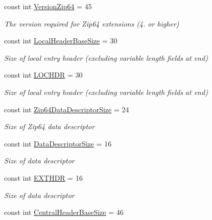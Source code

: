 \begin{DoxyCompactItemize}
const int \hyperlink{class_i_c_sharp_code_1_1_sharp_zip_lib_1_1_zip_1_1_zip_constants_a1ebeab1ac80ed9fc582bfc8f047a7cad}{Version\+Zip64} = 45
\begin{DoxyCompactList}\small\item\em The version required for Zip64 extensions (4. or higher) \end{DoxyCompactList}\item 
const int \hyperlink{class_i_c_sharp_code_1_1_sharp_zip_lib_1_1_zip_1_1_zip_constants_a4c5c8572a3161fe95c797a26c600f2bb}{Local\+Header\+Base\+Size} = 30
\begin{DoxyCompactList}\small\item\em Size of local entry header (excluding variable length fields at end) \end{DoxyCompactList}\item 
const int \hyperlink{class_i_c_sharp_code_1_1_sharp_zip_lib_1_1_zip_1_1_zip_constants_a3128975afc6b22ff497fbd267ea8b2d9}{L\+O\+C\+H\+DR} = 30
\begin{DoxyCompactList}\small\item\em Size of local entry header (excluding variable length fields at end) \end{DoxyCompactList}\item 
const int \hyperlink{class_i_c_sharp_code_1_1_sharp_zip_lib_1_1_zip_1_1_zip_constants_a72d0158b31709217c21b784c10b9dc29}{Zip64\+Data\+Descriptor\+Size} = 24
\begin{DoxyCompactList}\small\item\em Size of Zip64 data descriptor \end{DoxyCompactList}\item 
const int \hyperlink{class_i_c_sharp_code_1_1_sharp_zip_lib_1_1_zip_1_1_zip_constants_aaeaba7ff36a8402b21e66ad75d016541}{Data\+Descriptor\+Size} = 16
\begin{DoxyCompactList}\small\item\em Size of data descriptor \end{DoxyCompactList}\item 
const int \hyperlink{class_i_c_sharp_code_1_1_sharp_zip_lib_1_1_zip_1_1_zip_constants_ab6591d742cf3515463832b4e9e3f7863}{E\+X\+T\+H\+DR} = 16
\begin{DoxyCompactList}\small\item\em Size of data descriptor \end{DoxyCompactList}\item 
const int \hyperlink{class_i_c_sharp_code_1_1_sharp_zip_lib_1_1_zip_1_1_zip_constants_a834ac2b84b5f7f200463d9d2ebd65fd3}{Central\+Header\+Base\+Size} = 46

\end{DoxyCompactItemize}
